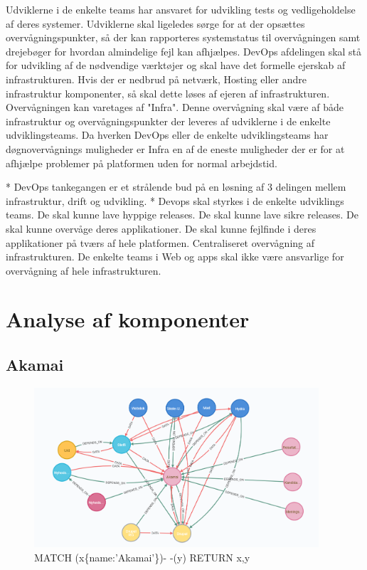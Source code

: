 \documentclass{article}
\begin{document}
Udviklerne i de enkelte teams har ansvaret for udvikling tests og vedligeholdelse af deres systemer. Udviklerne skal ligeledes sørge for at der opsættes overvågningspunkter, så der kan rapporteres systemstatus til overvågningen samt drejebøger for hvordan almindelige fejl kan afhjælpes.
DevOps afdelingen skal stå for udvikling af de nødvendige værktøjer og skal have det formelle ejerskab af infrastrukturen. Hvis der er nedbrud på netværk, Hosting eller andre infrastruktur komponenter, så skal dette løses af ejeren af infrastrukturen.
Overvågningen kan varetages af "Infra". Denne overvågning skal være af både infrastruktur og overvågningspunkter der leveres af udviklerne i de enkelte udviklingsteams. Da hverken DevOps eller de enkelte udviklingsteams har døgnovervågnings muligheder er Infra en af de eneste muligheder der er for at afhjælpe problemer på platformen uden for normal arbejdstid.



* DevOps tankegangen er et strålende bud på en løsning af 3 delingen mellem infrastruktur, drift og udvikling.
* Devops skal styrkes i de enkelte udviklings teams.
	De skal kunne lave hyppige releases.
	De skal kunne lave sikre releases.
	De skal kunne overvåge deres applikationer.
	De skal kunne fejlfinde i deres applikationer på tværs af hele platformen.
Centraliseret overvågning af infrastrukturen.
	De enkelte teams i Web og apps skal ikke være ansvarlige for overvågning af hele infrastrukturen.


\section{Analyse af komponenter}

\subsection{Akamai}
\begin{figure}[h]
\includegraphics[width=300pt]{Akamai.PNG}
\caption{MATCH (x\{name:'Akamai'\})- -(y) RETURN x,y}
\end{figure}
\end{document}
